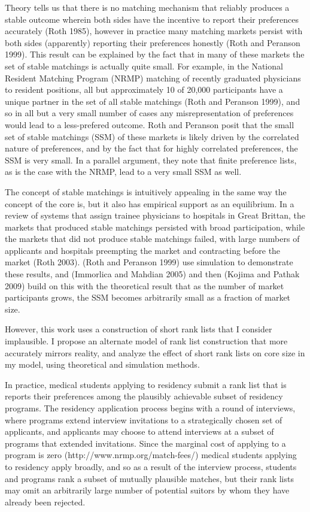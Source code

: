 \documentclass[WP]{AEA}
\begin{document}
Theory tells us that there is no matching mechanism that reliably produces a stable outcome wherein both sides have the incentive to report their preferences accurately (Roth 1985), however in practice many matching markets persist with both sides (apparently) reporting their preferences honestly  (Roth and Peranson 1999).  This result can be explained by the fact that in many of these markets the set of stable matchings is actually quite small.  For example, in the National Resident Matching Program (NRMP) matching of recently graduated physicians to resident positions, all but approximately 10 of 20,000 participants have a unique partner in the set of all stable matchings (Roth and Peranson 1999), and so in all but a very small number of cases any misrepresentation of preferences would lead to a less-prefered outcome. Roth and Peranson posit that the small set of stable matchings (SSM) of these markets is likely driven by the correlated nature of preferences, and by the fact that for highly correlated preferences, the SSM is very small.  In a parallel argument,  they note that finite preference lists, as is the case with the NRMP, lead to a very small SSM as well.  

The concept of stable matchings is intuitively appealing in the same way the concept of the core is, but it also has empirical support as an equilibrium. In a review of systems that assign trainee physicians to hospitals in Great Brittan, the markets that produced stable matchings persisted with broad participation, while the markets that did not produce stable matchings failed, with large numbers of applicants and hospitals preempting the market and contracting before the market (Roth 2003).
(Roth and Peranson 1999) use simulation to demonstrate these results, and (Immorlica and Mahdian 2005) and then (Kojima and Pathak 2009) build on this with the theoretical result that as the number of market participants grows, the SSM becomes arbitrarily small as a fraction of market size.  

However, this work uses a construction of short rank lists that I consider implausible.  I propose an alternate model of rank list construction that more accurately mirrors reality, and analyze the effect of short rank lists on core size in my model, using theoretical and simulation methods.

In practice, medical students applying to residency submit a rank list that is reports their preferences among the plausibly achievable subset of residency programs. The residency application process begins with a round of interviews, where programs extend interview invitations to a strategically chosen set of applicants, and applicants may choose to attend interviews at a subset of programs that extended invitations. Since the marginal cost of applying to a program is zero (http://www.nrmp.org/match-fees/) medical students applying to residency apply broadly, and so as a result of the interview process, students and programs rank a subset of mutually plausible matches, but their rank lists may omit an arbitrarily large number of potential suitors by whom they have already been rejected.
\end{document}
